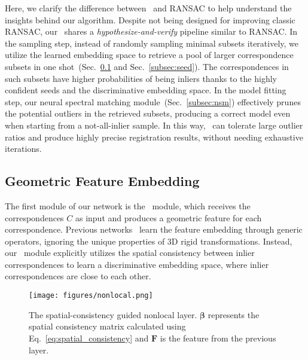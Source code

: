 Here, we clarify the difference between \Name~and RANSAC {to help understand the insights behind our algorithm}.
{Despite} not being designed for improving
classic RANSAC, our \Name~shares {a} \textit{hypothesize-and-verify} pipeline {similar to RANSAC}. In the sampling step, instead of randomly sampling minimal subsets iteratively, we utilize the learned embedding space to retrieve a pool of larger correspondence subsets in one shot~(Sec.~\ref{subsec:nonlocal} and Sec.~\ref{subsec:seed}). {The correspondences in such subsets} have higher probabilities {of being} inliers {thanks to the highly confident seeds and the discriminative embedding space}. In the model fitting step, our neural spectral matching module~(Sec.~\ref{subsec:nsm}) effectively prunes the potential outliers in the retrieved subsets, producing a correct model even when starting from a not-all-inlier sample. In this way, \Name~can tolerate large outlier ratios and produce highly precise registration results, without needing exhaustive iterations. 




\subsection{Geometric Feature Embedding}
\label{subsec:nonlocal}

The first module of our network is the \nonlocal~module, which receives the correspondences $C$ as input and produces a geometric feature for each correspondence. Previous networks~\cite{choy2020deep, pais20203dregnet} learn the feature embedding through generic operators,
ignoring the unique properties of 3D rigid transformations.
Instead, our \nonlocal~module explicitly utilizes the spatial consistency between inlier correspondences to learn a discriminative 
{embedding space, where inlier correspondences are close to each other.} 



\begin{figure}[t]
\setlength{\abovecaptionskip}{0.05cm}
\setlength{\belowcaptionskip}{-0.35cm}
	\vspace{-0.4cm}
	\centering
    \texttt{[image: figures/nonlocal.png]}
    \caption{The spatial-consistency guided nonlocal layer. $\bm{\beta}$ represents the spatial consistency matrix calculated using Eq.~\ref{eq:spatial_consistency} and $\bm{F}$ is the feature from {the} previous layer. 
}
\label{fig:nonlocal}
\end{figure}

